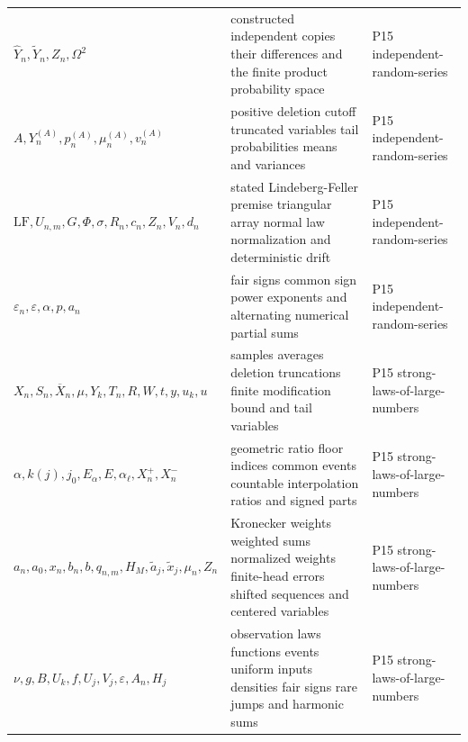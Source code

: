 \begin{longtable}{@{}p{}p{}p{}@{}}
\(\widehat Y_n,\allowbreak \widetilde Y_n,\allowbreak Z_n,\allowbreak \Omega^2\) & constructed independent copies their differences and the finite product probability space & P15 independent-\allowbreak{}random-\allowbreak{}series \\
\(A,\allowbreak Y_n^{(A)},\allowbreak p_n^{(A)},\allowbreak \mu_n^{(A)},\allowbreak v_n^{(A)}\) & positive deletion cutoff truncated variables tail probabilities means and variances & P15 independent-\allowbreak{}random-\allowbreak{}series \\
\(\mathrm{LF},\allowbreak U_{n,m},\allowbreak G,\allowbreak \Phi,\allowbreak \sigma,\allowbreak R_n,\allowbreak c_n,\allowbreak Z_n,\allowbreak V_n,\allowbreak d_n\) & stated Lindeberg-Feller premise triangular array normal law normalization and deterministic drift & P15 independent-\allowbreak{}random-\allowbreak{}series \\
\(\varepsilon_n,\allowbreak \varepsilon,\allowbreak \alpha,\allowbreak p,\allowbreak a_n\) & fair signs common sign power exponents and alternating numerical partial sums & P15 independent-\allowbreak{}random-\allowbreak{}series \\
\(X_n,\allowbreak S_n,\allowbreak \overline X_n,\allowbreak \mu,\allowbreak Y_k,\allowbreak T_n,\allowbreak R,\allowbreak W,\allowbreak t,\allowbreak y,\allowbreak u_k,\allowbreak u\) & samples averages deletion truncations finite modification bound and tail variables & P15 strong-\allowbreak{}laws-\allowbreak{}of-\allowbreak{}large-\allowbreak{}numbers \\
\(\alpha,\allowbreak k(j),\allowbreak j_0,\allowbreak E_\alpha,\allowbreak E,\allowbreak \alpha_\ell,\allowbreak X_n^+,\allowbreak X_n^-\) & geometric ratio floor indices common events countable interpolation ratios and signed parts & P15 strong-\allowbreak{}laws-\allowbreak{}of-\allowbreak{}large-\allowbreak{}numbers \\
\(a_n,\allowbreak a_0,\allowbreak x_n,\allowbreak b_n,\allowbreak b,\allowbreak q_{n,m},\allowbreak H_M,\allowbreak \widetilde a_j,\allowbreak \widetilde x_j,\allowbreak \mu_n,\allowbreak Z_n\) & Kronecker weights weighted sums normalized weights finite-head errors shifted sequences and centered variables & P15 strong-\allowbreak{}laws-\allowbreak{}of-\allowbreak{}large-\allowbreak{}numbers \\
\(\nu,\allowbreak g,\allowbreak B,\allowbreak U_k,\allowbreak f,\allowbreak U_j,\allowbreak V_j,\allowbreak \varepsilon,\allowbreak A_n,\allowbreak H_j\) & observation laws functions events uniform inputs densities fair signs rare jumps and harmonic sums & P15 strong-\allowbreak{}laws-\allowbreak{}of-\allowbreak{}large-\allowbreak{}numbers \\

\end{longtable}
